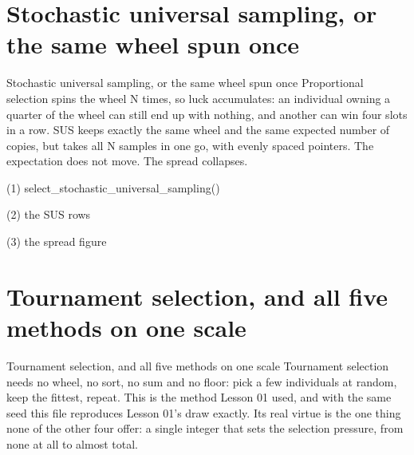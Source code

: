 \section{Stochastic universal sampling, or the same wheel spun once}

\begin{frame}{Stochastic universal sampling, or the same wheel spun once}
Proportional selection spins the wheel N times, so luck accumulates: an
individual owning a quarter of the wheel can still end up with nothing, and
another can win four slots in a row. SUS keeps exactly the same wheel and the
same expected number of copies, but takes all N samples in one go, with evenly
spaced pointers. The expectation does not move. The spread collapses.
\end{frame}

\begin{frame}[fragile]{(1) select\_stochastic\_universal\_sampling()}

\end{frame}

\begin{frame}[fragile]{(2) the SUS rows}

\end{frame}

\begin{frame}[fragile]{(3) the spread figure}

\end{frame}


\section{Tournament selection, and all five methods on one scale}

\begin{frame}{Tournament selection, and all five methods on one scale}
Tournament selection needs no wheel, no sort, no sum and no floor: pick a few
individuals at random, keep the fittest, repeat. This is the method Lesson 01
used, and with the same seed this file reproduces Lesson 01's draw exactly. Its
real virtue is the one thing none of the other four offer: a single integer that
sets the selection pressure, from none at all to almost total.
\end{frame}

